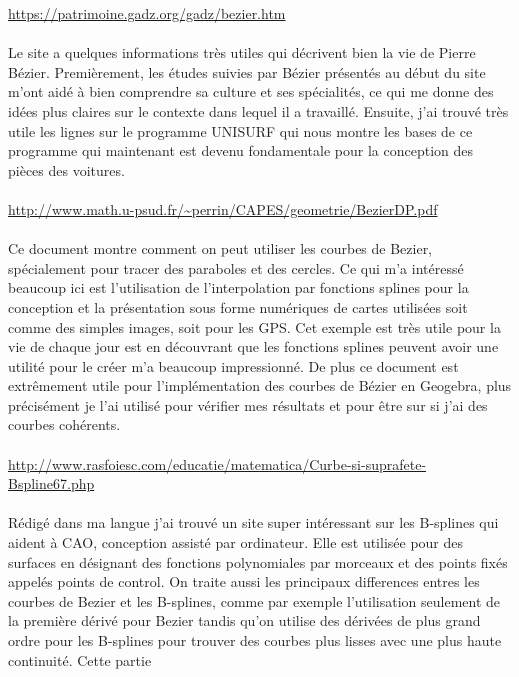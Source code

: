\documentclass{article}
\begin{document}
{\color{blue}
\url{https://patrimoine.gadz.org/gadz/bezier.htm}}
\\\\
Le site a quelques informations tr\`{e}s utiles qui d\'{e}crivent bien la vie de Pierre B\'{e}zier. Premi\`{e}rement,
les \'{e}tudes suivies par B\'{e}zier pr\'{e}sent\'{e}s au d\'{e}but du site m'ont aid\'{e} \`{a} bien comprendre sa culture et ses sp\'{e}cialit\'{e}s, ce qui me donne des id\'{e}es plus claires sur le contexte dans lequel il a travaill\'{e}. Ensuite,
j'ai trouv\'{e} tr\`{e}s utile les lignes sur le programme UNISURF qui nous montre les bases de ce
programme qui maintenant est devenu fondamentale pour la conception des pi\`{e}ces des voitures.
\\\\
{\color{blue}
\url{http://www.math.u-psud.fr/~perrin/CAPES/geometrie/BezierDP.pdf}}
\\\\
Ce document montre comment on peut utiliser les courbes de Bezier, sp\'{e}cialement pour tracer des
paraboles et des cercles. Ce qui m'a int\'{e}ress\'{e} beaucoup ici est l'utilisation de l'interpolation par
fonctions splines pour la conception et la pr\'{e}sentation sous forme num\'{e}riques de cartes utilis\'{e}es soit
comme des simples images, soit pour les GPS. Cet exemple est tr\`{e}s utile pour la vie de chaque jour
est en d\'{e}couvrant que les fonctions splines peuvent avoir une utilit\'{e} pour le cr\'{e}er m'a beaucoup
impressionn\'{e}. De plus ce document est extr\^{e}mement utile pour l'impl\'{e}mentation des courbes de
B\'{e}zier en Geogebra, plus pr\'{e}cis\'{e}ment je l'ai utilis\'{e} pour v\'{e}rifier mes r\'{e}sultats et pour \^{e}tre sur si j'ai
des courbes coh\'{e}rents.
\\\\
{\color{blue}
\url{http://www.rasfoiesc.com/educatie/matematica/Curbe-si-suprafete-Bspline67.php}}
\\\\
R\'{e}dig\'{e} dans ma langue j'ai trouv\'{e} un site super int\'{e}ressant sur les B-splines qui aident \`{a} CAO,
conception assist\'{e} par ordinateur. Elle est utilis\'{e}e pour des surfaces en d\'{e}signant des fonctions
polynomiales par morceaux et des points fix\'{e}s appel\'{e}s points de control. On traite aussi les
principaux differences entres les courbes de Bezier et les B-splines, comme par exemple l'utilisation
seulement de la premi\`{e}re d\'{e}riv\'{e} pour Bezier tandis qu'on utilise des d\'{e}riv\'{e}es de plus grand ordre
pour les B-splines pour trouver des courbes plus lisses avec une plus haute continuit\'{e}. Cette partie
\end{document}
